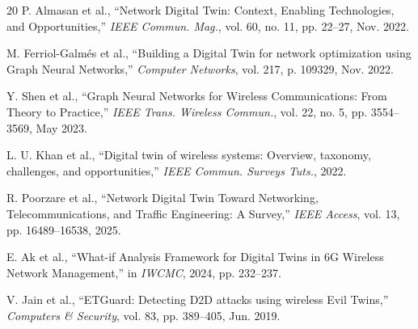 \documentclass[conference]{IEEEtran}
\begin{document}
\begin{thebibliography}{20}
P. Almasan et al., ``Network Digital Twin: Context, Enabling Technologies, and Opportunities,'' \textit{IEEE Commun. Mag.}, vol. 60, no. 11, pp. 22--27, Nov. 2022.

M. Ferriol-Galmés et al., ``Building a Digital Twin for network optimization using Graph Neural Networks,'' \textit{Computer Networks}, vol. 217, p. 109329, Nov. 2022.

Y. Shen et al., ``Graph Neural Networks for Wireless Communications: From Theory to Practice,'' \textit{IEEE Trans. Wireless Commun.}, vol. 22, no. 5, pp. 3554--3569, May 2023.

L. U. Khan et al., ``Digital twin of wireless systems: Overview, taxonomy, challenges, and opportunities,'' \textit{IEEE Commun. Surveys Tuts.}, 2022.

R. Poorzare et al., ``Network Digital Twin Toward Networking, Telecommunications, and Traffic Engineering: A Survey,'' \textit{IEEE Access}, vol. 13, pp. 16489--16538, 2025.

E. Ak et al., ``What-if Analysis Framework for Digital Twins in 6G Wireless Network Management,'' in \textit{IWCMC}, 2024, pp. 232--237.

V. Jain et al., ``ETGuard: Detecting D2D attacks using wireless Evil Twins,'' \textit{Computers \& Security}, vol. 83, pp. 389--405, Jun. 2019.

\end{thebibliography}
\end{document}
